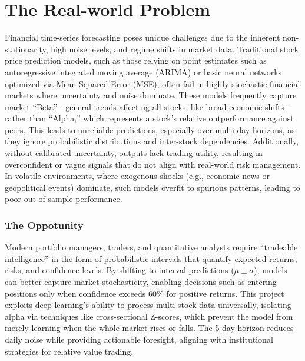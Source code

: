 \documentclass[twoside,final]{hcmut-report}
\begin{document}
\section*{The Real-world Problem}
Financial time-series forecasting poses unique challenges due to the inherent non-stationarity, high noise levels, and regime shifts in market data.   Traditional stock price prediction models, such as those relying on point estimates such as autoregressive integrated moving average (ARIMA) or basic neural networks optimized via Mean Squared Error (MSE), often fail in highly stochastic financial markets where uncertainty and noise dominate. These models frequently capture market ``Beta'' - general trends affecting all stocks, like broad economic shifts - rather than ``Alpha,'' which represents a stock's relative outperformance against peers. This leads to unreliable predictions, especially over multi-day horizons, as they ignore probabilistic distributions and inter-stock dependencies. Additionally, without calibrated uncertainty, outputs lack trading utility, resulting in overconfident or vague signals that do not align with real-world risk management. In volatile environments, where exogenous shocks (e.g., economic news or geopolitical events) dominate, such models overfit to spurious patterns, leading to poor out-of-sample performance.\\

\subsubsection*{The Oppotunity}
Modern portfolio managers, traders, and quantitative analysts require ``tradeable intelligence'' in the form of probabilistic intervals that quantify expected returns, risks, and confidence levels. By shifting to interval predictions ($\mu \pm \sigma$), models can better capture market stochasticity, enabling decisions such as entering positions only when confidence exceeds 60\% for positive returns. This project exploits deep learning's ability to process multi-stock data universally, isolating alpha via techniques like cross-sectional Z-scores, which prevent the model from merely learning when the whole market rises or falls. The 5-day horizon reduces daily noise while providing actionable foresight, aligning with institutional strategies for relative value trading.
\end{document}
